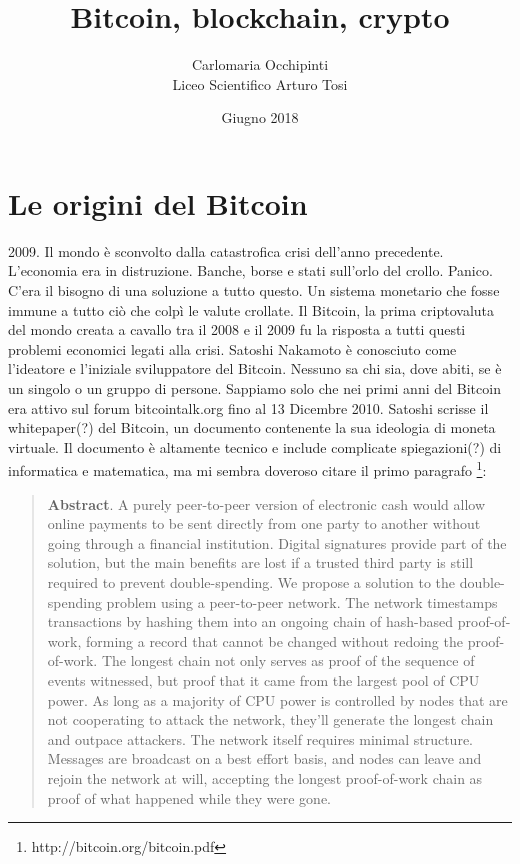 \documentclass {article}
\title {{\Huge Bitcoin, blockchain, crypto}}
\author {Carlomaria Occhipinti\\Liceo Scientifico Arturo Tosi}
\date {Giugno 2018}
\begin{document}
\maketitle


\newpage

\tableofcontents


\newpage


\section {Le origini del Bitcoin}


2009. Il mondo è sconvolto dalla catastrofica crisi dell'anno precedente.
L'economia era in distruzione. Banche, borse e stati sull'orlo del crollo. Panico.
C'era il bisogno di una soluzione a tutto questo. Un sistema monetario che fosse immune a tutto ciò che colpì le valute crollate. Il Bitcoin, la prima criptovaluta del mondo creata a cavallo tra il 2008 e il 2009 fu la risposta a tutti questi problemi economici legati alla crisi.
Satoshi Nakamoto è conosciuto come l'ideatore e l'iniziale sviluppatore del Bitcoin. Nessuno sa chi sia, dove abiti, se è un singolo o un gruppo di persone. Sappiamo solo che nei primi anni del Bitcoin era attivo sul forum bitcointalk.org fino al 13 Dicembre 2010.
Satoshi scrisse il whitepaper(?) del Bitcoin, un documento contenente la sua ideologia di moneta virtuale. Il documento è altamente tecnico e include complicate spiegazioni(?) di informatica e matematica, ma mi sembra doveroso citare il primo paragrafo \footnote{http://bitcoin.org/bitcoin.pdf}:\\

\begin {quote}

\textbf {Abstract}. A purely peer-to-peer version of electronic cash would allow online payments to be sent directly from one party to another without going through a financial institution. Digital signatures provide part of the solution, but the main benefits are lost if a trusted third party is still required to prevent double-spending. We propose a solution to the double-spending problem using a peer-to-peer network. The network timestamps transactions by hashing them into an ongoing chain of hash-based proof-of-work, forming a record that cannot be changed without redoing the proof-of-work. The longest chain not only serves as proof of the sequence of events witnessed, but proof that it came from the largest pool of CPU power. As long as a majority of CPU power is controlled by nodes that are not cooperating to attack the network, they'll generate the longest chain and outpace attackers. The network itself requires minimal structure. Messages are broadcast on a best effort basis, and nodes can leave and rejoin the network at will, accepting the longest proof-of-work chain as proof of what happened while they were gone.

\end {quote}
\end{document}
